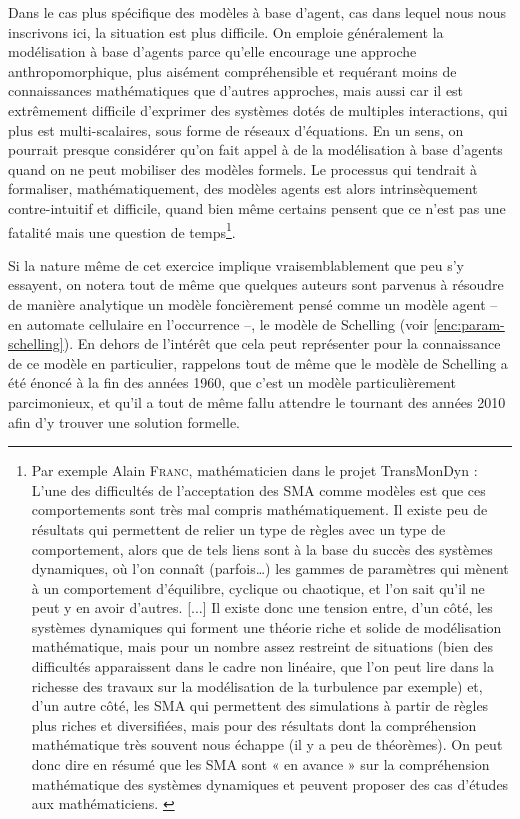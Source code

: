 Dans le cas plus spécifique des modèles à base d'agent, cas dans lequel nous nous inscrivons ici, la situation est plus difficile.
On emploie généralement la modélisation à base d'agents parce qu'elle encourage une approche anthropomorphique, plus aisément compréhensible et requérant moins de connaissances mathématiques que d'autres approches, mais aussi car il est extrêmement difficile d'exprimer des systèmes dotés de multiples interactions, qui plus est multi-scalaires, sous forme de réseaux d'équations.
En un sens, on pourrait presque considérer qu'on fait appel à de la modélisation à base d'agents quand on ne peut mobiliser des modèles formels.
Le processus qui tendrait à formaliser, mathématiquement, des modèles agents est alors intrinsèquement contre-intuitif et difficile, quand bien même certains pensent que ce n'est pas une fatalité mais une question de temps\footnote{
	Par exemple Alain \textsc{Franc}, mathématicien dans le projet TransMonDyn :
	\og L'une des difficultés de l'acceptation des SMA comme modèles est que ces comportements sont très mal compris mathématiquement.
	Il existe peu de résultats qui permettent de relier un type de règles avec un type de comportement, alors que de tels liens sont à la base du succès des systèmes dynamiques, où l'on connaît (parfois\ldots) les gammes de paramètres qui mènent à un comportement d'équilibre, cyclique ou chaotique, et l'on sait qu'il ne peut y en avoir d'autres.
	[...]
	Il existe donc une tension entre, d'un côté, les systèmes dynamiques qui forment une théorie riche et solide de modélisation mathématique, mais pour un nombre assez restreint de situations (bien des difficultés apparaissent dans le cadre non linéaire, que l'on peut lire dans la richesse des travaux sur la modélisation de la turbulence par exemple) et, d'un autre côté, les SMA qui permettent des simulations à partir de règles plus riches et diversifiées, mais pour des résultats dont la compréhension mathématique très souvent nous échappe (il y a peu de théorèmes).
	On peut donc dire en résumé que les SMA sont « en avance » sur la compréhension mathématique des systèmes dynamiques et peuvent proposer des cas d'études aux mathématiciens.\fg{}
	\autocite[Annexe 2, \og Retour sur les SMA comme outil et cadre conceptuel de modélisation.\fg{}, pp. 479-482 ]{ouriachi_lelaboration_2017}
}.

Si la nature même de cet exercice implique vraisemblablement que peu s'y essayent, on notera tout de même que quelques auteurs \autocite{zhang_tipping_2011,grauwin_dynamic_2012} sont parvenus à résoudre de manière analytique un modèle foncièrement pensé comme un modèle agent -- en automate cellulaire en l'occurrence --, le modèle de Schelling (voir \cref{enc:param-schelling}).
En dehors de l'intérêt que cela peut représenter pour la connaissance de ce modèle en particulier, rappelons tout de même que le modèle de Schelling a été énoncé à la fin des années 1960, que c'est un modèle particulièrement parcimonieux, et qu'il a tout de même fallu attendre le tournant des années 2010 afin d'y trouver une solution formelle.

